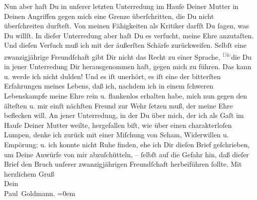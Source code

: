 \begin{ledgroupsized}[t]{13cm}
           \pstart
           Nun aber haſt Du in unſerer letzten Unterredung im Hauſe Deiner Mutter in Deinen Angriffen gegen mich eine Grenze
               überſchritten, die Du {\pb}nicht überſchreiten
               durfteſt. Von meinen Fähigkeiten als Kritiker darfſt Du ſagen, was Du willſt. In
               dieſer Unterredung aber haſt Du es verſucht, meine Ehre anzutaſten. Und dieſen
               Verſuch muß ich mit der äußerſten Schärfe zurückweiſen.  Selbſt eine
               zwanzigjährige Freundſchaft gibt Dir nicht das Recht zu einer Sprache, \substVorne{}\textsuperscript{\textcolor{gray}{D}i\textcolor{gray}{e}}\substDazwischen{}die\substHinten{} Du in jener Unterredung Dir herausgenommen haſt, gegen mich zu führen. Das
               kann u. werde ich nicht {\pb}dulden! Und es iſt  unerhört, es iſt eine der bitterſten Erfahrungen
               meines Lebens, daß ich, nachdem ich in einem ſchweren Lebenskampfe meine Ehre rein u.
               flankenlos erhalten habe, mich nun gegen den älteſten u. mir einſt nächſten Freund
               zur Wehr ſetzen  muß, der meine Ehre \strikeout{\textcolor{gray}{bef}} beflecken will. An jener Unterredung, in der  Du über mich, der ich als Gaſt im Hauſe Deiner Mutter weilte, {\pb}\strikeout{\textcolor{gray}{×}\-\textcolor{gray}{×}\-\textcolor{gray}{×}\-\textcolor{gray}{×}\-\textcolor{gray}{×}\-\textcolor{gray}{×}} hergefallen biſt, wie über einen charakterloſen Lumpen, denke ich zurück mit
               einer Miſchung von Scham, Widerwillen u. Empörung; u. ich konnte nicht Ruhe finden,
               ehe ich Dir dieſen Brief geſchrieben, um Deine Anwürfe von mir abzuſchütteln, –
               ſelbſt auf die Gefahr hin, daß dieſer Brief den Bruch unſerer zwanzigjährigen
               Freundſchaft herbeiführen ſollte.\pend
           \pstart
           {\pb}Mit herzlichem Gruß {\\[\baselineskip]}Dein {\\[\baselineskip]}\spacefill\mbox{Paul Goldmann.}\pend
           \leftskip=0em{}
         
         \endnumbering{}\end{ledgroupsized}  \newcommand{\dateiname}{L03475}\newcommand{\titel}{Paul Goldmann an Arthur Schnitzler, 13. 1. 1911}\newcommand{\editorInnen}{Martin Anton Müller und Laura Untner}
      